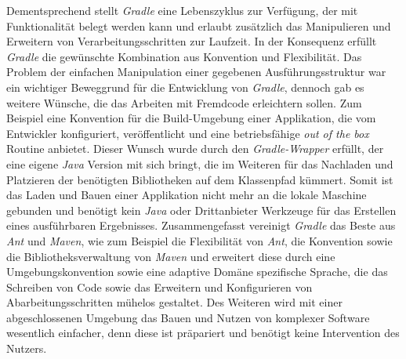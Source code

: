 		Dementsprechend stellt \textit{Gradle} eine Lebenszyklus zur Verfügung, der mit Funktionalität belegt werden kann und erlaubt zusätzlich das Manipulieren und Erweitern von Verarbeitungsschritten zur Laufzeit. In der Konsequenz erfüllt \textit{Gradle} die gewünschte Kombination aus Konvention und Flexibilität.\bigbreak 
		Das Problem der einfachen Manipulation einer gegebenen Ausführungsstruktur war ein wichtiger Beweggrund für die Entwicklung von \textit{Gradle}, dennoch gab es weitere Wünsche, die das Arbeiten mit Fremdcode erleichtern sollen. Zum Beispiel eine Konvention für die Build-Umgebung einer Applikation, die vom Entwickler konfiguriert, veröffentlicht und eine betriebsfähige \textit{out of the box} Routine anbietet. Dieser Wunsch wurde durch den \textit{Gradle-Wrapper} erfüllt, der eine eigene \textit{Java} Version mit sich bringt, die im Weiteren für das Nachladen und Platzieren der benötigten Bibliotheken auf dem Klassenpfad kümmert. Somit ist das Laden und Bauen einer Applikation nicht mehr an die lokale Maschine gebunden und benötigt kein \textit{Java} oder Drittanbieter Werkzeuge für das Erstellen eines ausführbaren Ergebnisses. \newline
		Zusammengefasst vereinigt \textit{Gradle} das Beste aus \textit{Ant} und \textit{Maven}, wie zum Beispiel die Flexibilität von \textit{Ant}, die Konvention sowie die Bibliotheksverwaltung von \textit{Maven} und erweitert diese durch eine Umgebungskonvention sowie eine adaptive Domäne spezifische Sprache, die das Schreiben von Code sowie das Erweitern und Konfigurieren von Abarbeitungsschritten mühelos gestaltet. Des Weiteren wird mit einer abgeschlossenen Umgebung das Bauen und Nutzen von komplexer Software wesentlich einfacher, denn diese ist präpariert und benötigt keine Intervention des Nutzers. \bigbreak

